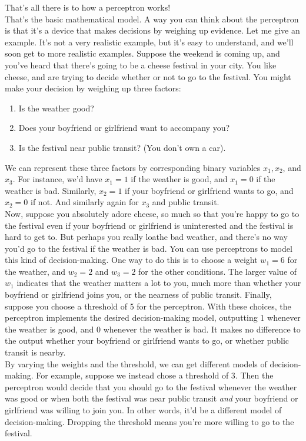 That's all there is to how a perceptron works!\\

That's the basic mathematical model. A way you can think about the perceptron is that it's a device that makes decisions by weighing up evidence. Let me give an example. It's not a very realistic example, but it's easy to understand, and we'll soon get to more realistic examples. Suppose the weekend is coming up, and you've heard that there's going to be a cheese festival in your city. You like cheese, and are trying to decide whether or not to go to the festival. You might make your decision by weighing up three factors:
\begin{enumerate}
\item Is the weather good?
\item Does your boyfriend or girlfriend want to accompany you?
\item Is the festival near public transit? (You don't own a car).
\end{enumerate}

We can represent these three factors by corresponding binary variables $x_1,x_2$, and $x_3$. For instance, we'd have $x_1=1$ if the weather is good, and $x_1=0$ if the weather is bad. Similarly, $x_2=1$ if your boyfriend or girlfriend wants to go, and $x_2=0$ if not. And similarly again for $x_3$ and public transit.\\

Now, suppose you absolutely adore cheese, so much so that you're happy to go to the festival even if your boyfriend or girlfriend is uninterested and the festival is hard to get to. But perhaps you really loathe bad weather, and there's no way you'd go to the festival if the weather is bad. You can use perceptrons to model this kind of decision-making. One way to do this is to choose a weight $w_1=6$ for the weather, and $w_2=2$ and $w_3=2$ for the other conditions. The larger value of $w_1$ indicates that the weather matters a lot to you, much more than whether your boyfriend or girlfriend joins you, or the nearness of public transit. Finally, suppose you choose a threshold of 5
 for the perceptron. With these choices, the perceptron implements the desired decision-making model, outputting 1
 whenever the weather is good, and 0
 whenever the weather is bad. It makes no difference to the output whether your boyfriend or girlfriend wants to go, or whether public transit is nearby.\\
 
By varying the weights and the threshold, we can get different models of decision-making. For example, suppose we instead chose a threshold of 3. Then the perceptron would decide that you should go to the festival whenever the weather was good or when both the festival was near public transit \textit{and} your boyfriend or girlfriend was willing to join you. In other words, it'd be a different model of decision-making. Dropping the threshold means you're more willing to go to the festival.\\

